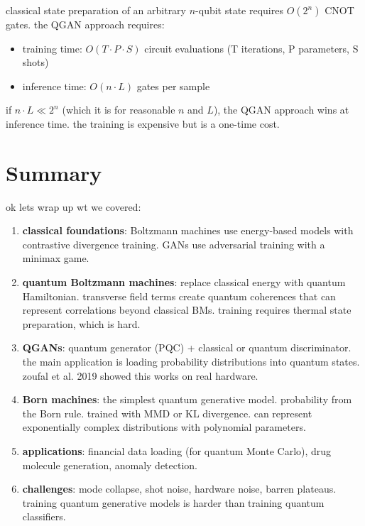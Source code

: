 \documentclass[11pt,a4paper]{article}
\theoremstyle{definition}
\theoremstyle{remark}
\begin{document}
classical state preparation of an arbitrary $n$-qubit state requires $O(2^n)$ CNOT gates. the QGAN approach requires:
\begin{itemize}[nosep]
    \item training time: $O(T \cdot P \cdot S)$ circuit evaluations (T iterations, P parameters, S shots)
    \item inference time: $O(n \cdot L)$ gates per sample
\end{itemize}

if $n \cdot L \ll 2^n$ (which it is for reasonable $n$ and $L$), the QGAN approach wins at inference time. the training is expensive but is a one-time cost.

\section{Summary}

ok lets wrap up wt we covered:

\begin{enumerate}[label=\arabic*.]
    \item \textbf{classical foundations}: Boltzmann machines use energy-based models with contrastive divergence training. GANs use adversarial training with a minimax game.

    \item \textbf{quantum Boltzmann machines}: replace classical energy with quantum Hamiltonian. transverse field terms create quantum coherences that can represent correlations beyond classical BMs. training requires thermal state preparation, which is hard.

    \item \textbf{QGANs}: quantum generator (PQC) + classical or quantum discriminator. the main application is loading probability distributions into quantum states. zoufal et al. 2019 showed this works on real hardware.

    \item \textbf{Born machines}: the simplest quantum generative model. probability from the Born rule. trained with MMD or KL divergence. can represent exponentially complex distributions with polynomial parameters.

    \item \textbf{applications}: financial data loading (for quantum Monte Carlo), drug molecule generation, anomaly detection.

    \item \textbf{challenges}: mode collapse, shot noise, hardware noise, barren plateaus. training quantum generative models is harder than training quantum classifiers.
\end{enumerate}
\end{document}
